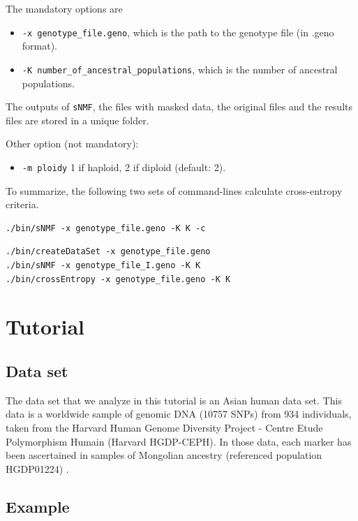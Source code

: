 \documentclass[10pt,a4paper]{article}
\begin{document}
\begin{itemize}
The mandatory options are
\begin{itemize}
\item \verb|-x genotype_file.geno|, which is the path to the genotype file (in .geno format).
\item \verb|-K number_of_ancestral_populations|, which is the number of ancestral populations.
\end{itemize}

The outputs of {\tt sNMF}, the files with masked data, the original files and the results files 
are stored in a unique folder.

\noindent
Other option (not mandatory):
\begin{itemize}
\item \verb|-m ploidy|  1 if haploid, 2 if diploid (default: 2). 
\end{itemize}

\end{itemize}

To summarize, the following two sets of command-lines calculate cross-entropy criteria. 
\begin{Verbatim}[frame=single]
./bin/sNMF -x genotype_file.geno -K K -c
\end{Verbatim}

\begin{Verbatim}[frame=single]
./bin/createDataSet -x genotype_file.geno 
./bin/sNMF -x genotype_file_I.geno -K K
./bin/crossEntropy -x genotype_file.geno -K K
\end{Verbatim}

\section{Tutorial}

\subsection{Data set}
The data set that we analyze in this tutorial is an Asian human data set.
This data is a worldwide sample of genomic DNA (10757 SNPs) from 934 individuals,
taken from the Harvard Human Genome Diversity Project - Centre
Etude Polymorphism Humain (Harvard HGDP-CEPH). 
In those data, each marker has been ascertained in samples of Mongolian
ancestry (referenced population HGDP01224) \cite{Patterson_2012}. 

\subsection{Example}
\end{document}

